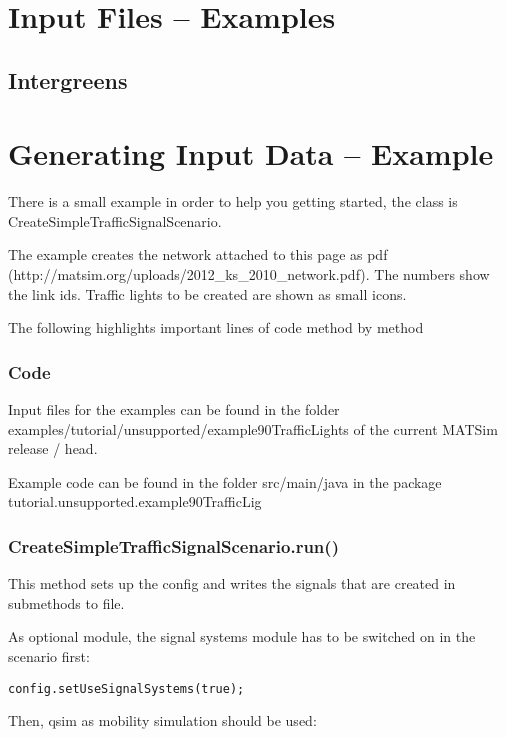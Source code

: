 \section{Input Files -- Examples}

\subsection{Intergreens}
\lstset{breaklines=true,language=XML}



\section{Generating Input Data -- Example}

There is a small example in order to help you getting started, the class is CreateSimpleTrafficSignalScenario.

The example creates the network attached to this page as pdf (http://matsim.org/uploads/2012\_ks\_2010\_network.pdf). The numbers show the link ids. Traffic lights to be created are shown as small icons.

The following highlights important lines of code method by method

\subsubsection{Code}

Input files for the examples can be found in the folder examples/tutorial/unsupported/example90TrafficLights of the current MATSim release / head.

Example code can be found in the folder src/main/java in the package tutorial.unsupported.example90TrafficLig

\subsubsection{CreateSimpleTrafficSignalScenario.run()}

This method sets up the config and writes the signals that are created in submethods to file.

As optional module, the signal systems module has to be switched on in the scenario first:


\texttt{\nolinebreak config.setUseSignalSystems(true);}

Then, qsim as mobility simulation should be used:


